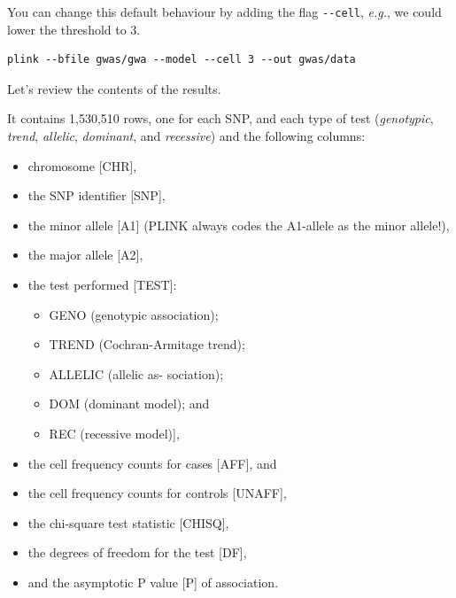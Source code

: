 \documentclass[
]{book}
\newenvironment{Shaded}{\begin{snugshade}}{\end{snugshade}}
\newcommand{\DecValTok}[1]{\textcolor[rgb]{0.00,0.00,0.81}{#1}}
\newcommand{\FunctionTok}[1]{\textcolor[rgb]{0.00,0.00,0.00}{#1}}
\newcommand{\NormalTok}[1]{#1}
\newcommand{\OtherTok}[1]{\textcolor[rgb]{0.56,0.35,0.01}{#1}}
\newcommand{\SpecialCharTok}[1]{\textcolor[rgb]{0.00,0.00,0.00}{#1}}
\newcommand{\StringTok}[1]{\textcolor[rgb]{0.31,0.60,0.02}{#1}}
\providecommand{\tightlist}{%
  \setlength{\itemsep}{0pt}\setlength{\parskip}{0pt}}
\begin{document}
You can change this default behaviour by adding the flag \texttt{-\/-cell}, \emph{e.g.}, we could lower the threshold to 3.

\begin{verbatim}
plink --bfile gwas/gwa --model --cell 3 --out gwas/data
\end{verbatim}

Let's review the contents of the results.

\begin{Shaded}
\end{Shaded}

It contains 1,530,510 rows, one for each SNP, and each type of test (\emph{genotypic}, \emph{trend}, \emph{allelic}, \emph{dominant}, and \emph{recessive}) and the following columns:

\begin{itemize}
\tightlist
\item
  chromosome {[}CHR{]},
\item
  the SNP identifier {[}SNP{]},
\item
  the minor allele {[}A1{]} (PLINK always codes the A1-allele as the minor allele!),
\item
  the major allele {[}A2{]},
\item
  the test performed {[}TEST{]}:

  \begin{itemize}
  \tightlist
  \item
    GENO (genotypic association);
  \item
    TREND (Cochran-Armitage trend);
  \item
    ALLELIC (allelic as- sociation);
  \item
    DOM (dominant model); and
  \item
    REC (recessive model){]},
  \end{itemize}
\item
  the cell frequency counts for cases {[}AFF{]}, and
\item
  the cell frequency counts for controls {[}UNAFF{]},
\item
  the chi-square test statistic {[}CHISQ{]},
\item
  the degrees of freedom for the test {[}DF{]},
\item
  and the asymptotic P value {[}P{]} of association.
\end{itemize}
\end{document}

